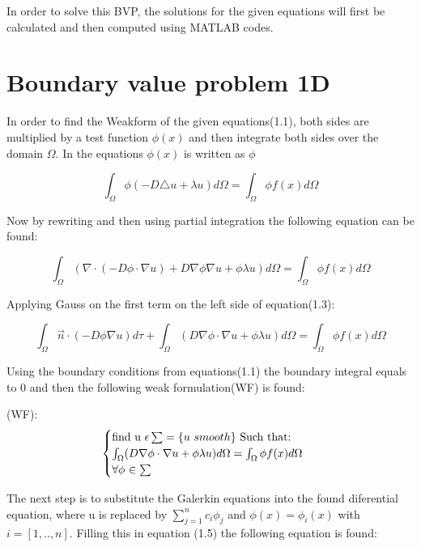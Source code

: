 \documentclass[a4paper]{report}
\begin{document}
In order to solve this BVP, the solutions for the given equations will first be calculated and then computed using MATLAB codes.


\section{Boundary value problem 1D}
\vspace{5mm}

In order to find the Weakform of the given equations(1.1), both sides are multiplied by a test function  $\phi(x)$ and then integrate both sides over the domain $\Omega$. In the equations  $\phi(x)$ is written as $\phi$


\begin{equation}
	 \int_{\Omega} \phi(-D\triangle u + \lambda u )d\Omega = \int_{\Omega} \phi f(x) d\Omega 
\end{equation}	
\smallskip

Now by rewriting and then using partial integration the following equation can be found:


\begin{equation}
	\int_{\Omega} (\nabla\cdot(-D\phi\cdot\nabla u) + D\nabla\phi\nabla u +\phi \lambda u) d\Omega = \int_{\Omega} \phi f(x) d\Omega 
\end{equation}
\smallskip

Applying Gauss on the first term on the left side of equation(1.3):


\begin{equation}
	\int_{\Omega}  \vec{n}\cdot(-D\phi \nabla u) d\tau + \int_{\Omega}  (D\nabla\phi\cdot\nabla u +\phi\lambda u )d\Omega = \int_{\Omega} \phi f(x) d\Omega 
\end{equation}
\smallskip

Using the boundary conditions from equations(1.1) the boundary integral equals to 0 and then the following weak formulation(WF) is found: \vspace{5mm}


(WF): \begin{equation}
\begin{cases} 
	$find u $\epsilon \sum =\{u$ $ smooth\}$ Such that:$ \\ \int_{\Omega}  (D\nabla\phi\cdot\nabla u +\phi\lambda u )d\Omega = \int_{\Omega} \phi f(x) d\Omega \\ \forall\phi $ $ \in\sum 
\end{cases}\  
\end{equation}

\bigskip
The next step is to substitute the Galerkin equations into the found diferential equation, where u is replaced by $ \sum_{j=1}^{n}c_i\phi_j $ and  $\phi(x)=\phi_i(x)$ with $i = [1,..,n]$. Filling this in equation (1.5) the following equation is found:
\end{document}
